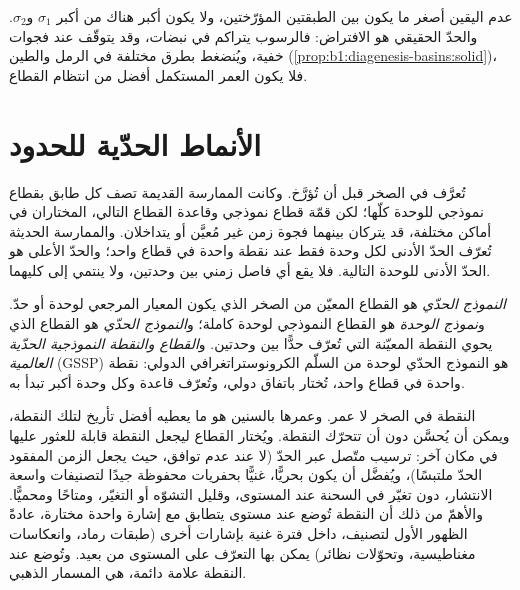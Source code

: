 عدم اليقين أصغر ما يكون بين الطبقتين المؤرّختين، ولا يكون أكبر هناك من أكبر $\sigma_1$ و$\sigma_2$. والحدّ الحقيقي هو الافتراض: فالرسوب يتراكم في نبضات، وقد يتوقّف عند فجوات خفية، ويُنضغط بطرق مختلفة في الرمل والطين (\cref{prop:b1:diagenesis-basins:solid})، فلا يكون العمر المستكمل أفضل من انتظام القطاع.

\section{الأنماط الحدّية للحدود}\label{sec:b1:stratigraphic-scale:gssp}

تُعرَّف  في الصخر قبل أن تُؤرَّخ. وكانت الممارسة القديمة تصف كل طابق بقطاع نموذجي للوحدة كلّها؛ لكن قمّة قطاع نموذجي وقاعدة القطاع التالي، المختاران في أماكن مختلفة، قد يتركان بينهما فجوة زمن غير مُعيَّن أو يتداخلان. والممارسة الحديثة تُعرّف الحدّ الأدنى لكل وحدة فقط عند نقطة واحدة في قطاع واحد؛ والحدّ الأعلى هو الحدّ الأدنى للوحدة التالية. فلا يقع أي فاصل زمني بين وحدتين، ولا ينتمي إلى كليهما.

\begin{definition}\label{def:b1:stratigraphic-scale:gssp}
\emph{النموذج الحدّي} هو القطاع المعيّن من الصخر الذي يكون المعيار المرجعي لوحدة أو حدّ. و\emph{نموذج الوحدة} هو القطاع النموذجي لوحدة كاملة؛ و\emph{النموذج الحدّي} هو القطاع الذي يحوي النقطة المعيّنة التي تُعرّف حدًّا بين وحدتين. و\emph{القطاع والنقطة النموذجية الحدّية العالمية} (GSSP) هو النموذج الحدّي لوحدة من السلّم الكرونوستراتغرافي الدولي: نقطة واحدة في قطاع واحد، تُختار باتفاق دولي، وتُعرّف قاعدة  وكل وحدة أكبر تبدأ به.
\end{definition}

النقطة في الصخر لا عمر. وعمرها بالسنين هو ما يعطيه أفضل تأريخ لتلك النقطة، ويمكن أن يُحسَّن دون أن تتحرّك النقطة. ويُختار القطاع ليجعل النقطة قابلة للعثور عليها في مكان آخر: ترسيب متّصل عبر الحدّ (لا عند عدم توافق، حيث يجعل الزمن المفقود الحدّ ملتبسًا)، ويُفضَّل أن يكون بحريًّا، غنيًّا بحفريات محفوظة جيدًا لتصنيفات واسعة الانتشار، دون تغيّر في السحنة عند المستوى، وقليل التشوّه أو التغيّر، ومتاحًا ومحميًّا. والأهمّ من ذلك أن النقطة تُوضع عند مستوى يتطابق مع إشارة واحدة مختارة، عادةً الظهور الأول لتصنيف، داخل فترة غنية بإشارات أخرى (طبقات رماد، وانعكاسات مغناطيسية، وتحوّلات نظائر) يمكن بها التعرّف على المستوى من بعيد. وتُوضع عند النقطة علامة دائمة، هي المسمار الذهبي.

